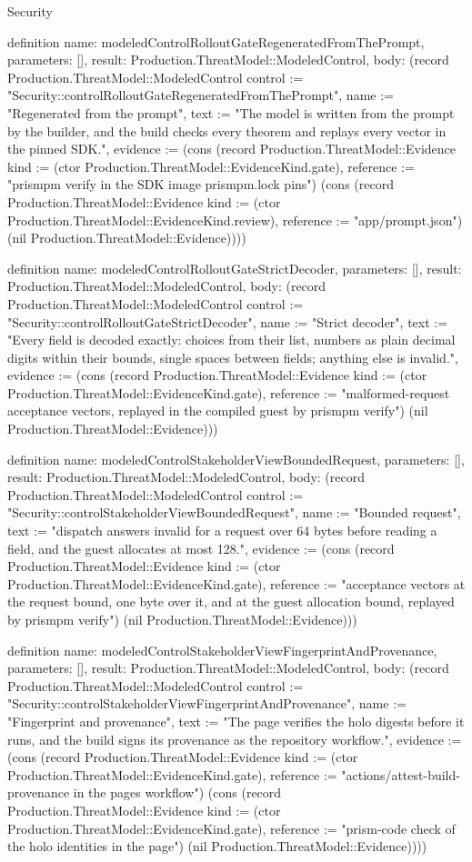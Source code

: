 \begin{lexlean}{Security}
\begin{semanticmodule}
definition{
  name: modeledControlRolloutGateRegeneratedFromThePrompt,
  parameters: [],
  result: Production.ThreatModel::ModeledControl,
  body: (record Production.ThreatModel::ModeledControl {control := "Security::controlRolloutGateRegeneratedFromThePrompt", name := "Regenerated from the prompt", text := "The model is written from the prompt by the builder, and the build checks every theorem and replays every vector in the pinned SDK.", evidence := (cons (record Production.ThreatModel::Evidence {kind := (ctor Production.ThreatModel::EvidenceKind.gate), reference := "prismpm verify in the SDK image prismpm.lock pins"}) (cons (record Production.ThreatModel::Evidence {kind := (ctor Production.ThreatModel::EvidenceKind.review), reference := "app/prompt.json"}) (nil Production.ThreatModel::Evidence)))})
}

definition{
  name: modeledControlRolloutGateStrictDecoder,
  parameters: [],
  result: Production.ThreatModel::ModeledControl,
  body: (record Production.ThreatModel::ModeledControl {control := "Security::controlRolloutGateStrictDecoder", name := "Strict decoder", text := "Every field is decoded exactly: choices from their list, numbers as plain decimal digits within their bounds, single spaces between fields; anything else is invalid.", evidence := (cons (record Production.ThreatModel::Evidence {kind := (ctor Production.ThreatModel::EvidenceKind.gate), reference := "malformed-request acceptance vectors, replayed in the compiled guest by prismpm verify"}) (nil Production.ThreatModel::Evidence))})
}

definition{
  name: modeledControlStakeholderViewBoundedRequest,
  parameters: [],
  result: Production.ThreatModel::ModeledControl,
  body: (record Production.ThreatModel::ModeledControl {control := "Security::controlStakeholderViewBoundedRequest", name := "Bounded request", text := "dispatch answers invalid for a request over 64 bytes before reading a field, and the guest allocates at most 128.", evidence := (cons (record Production.ThreatModel::Evidence {kind := (ctor Production.ThreatModel::EvidenceKind.gate), reference := "acceptance vectors at the request bound, one byte over it, and at the guest allocation bound, replayed by prismpm verify"}) (nil Production.ThreatModel::Evidence))})
}

definition{
  name: modeledControlStakeholderViewFingerprintAndProvenance,
  parameters: [],
  result: Production.ThreatModel::ModeledControl,
  body: (record Production.ThreatModel::ModeledControl {control := "Security::controlStakeholderViewFingerprintAndProvenance", name := "Fingerprint and provenance", text := "The page verifies the holo digests before it runs, and the build signs its provenance as the repository workflow.", evidence := (cons (record Production.ThreatModel::Evidence {kind := (ctor Production.ThreatModel::EvidenceKind.gate), reference := "actions/attest-build-provenance in the pages workflow"}) (cons (record Production.ThreatModel::Evidence {kind := (ctor Production.ThreatModel::EvidenceKind.gate), reference := "prism-code check of the holo identities in the page"}) (nil Production.ThreatModel::Evidence)))})
}


\end{semanticmodule}
\end{lexlean}
